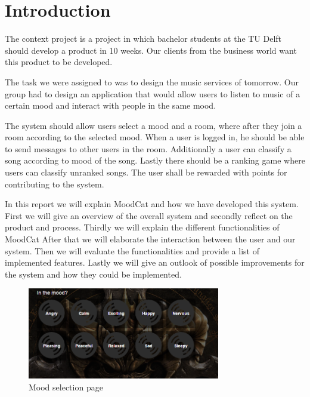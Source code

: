 \chapter{Introduction}

The context project is a project in which bachelor students at the TU Delft should develop a product in 10 weeks.
Our clients from the business world want this product to be developed.

The task we were assigned to was to design the music services of tomorrow.
Our group had to design an application that would allow users to listen to music of a certain mood and interact with people in the same mood.


The system should allow users select a mood and a room, where after they join a room according to the selected mood.
When a user is logged in, he should be able to send messages to other users in the room.
Additionally a user can classify a song according to mood of the song.
Lastly there should be a ranking game where users can classify unranked songs.
The user shall be rewarded with points for contributing to the system.


In this report we will explain MoodCat and how we have developed this system.
First we will give an overview of the overall system and secondly reflect on the product and process.
Thirdly we will explain the different functionalities of MoodCat After that we will elaborate the interaction between the user and our system.
Then we will evaluate the functionalities and provide a list of implemented features.
Lastly we will give an outlook of possible improvements for the system and how they could be implemented.\\

\begin{figure}
\centering
\includegraphics[width= 0.75\textwidth]{moodselection.png}
\caption{Mood selection page}
\end{figure}
